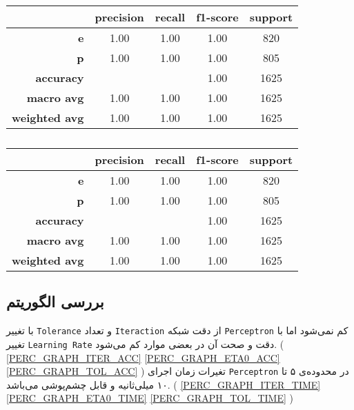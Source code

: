 \begin{latin}
\begin{table}[h!]
  \begin{center}
    \caption{}
    \label{PERC_TAB}
    \begin{tabular}{r|c|c|c|c} %
  & \textbf{precision}  & \textbf{recall} & \textbf{f1-score} & \textbf{support} \\
      \hline
           \textbf{e} & 1.00 & 1.00 & 1.00 & 820\\
           \textbf{p} & 1.00 & 1.00 & 1.00 & 805\\

    \textbf{accuracy} & & & 1.00 & 1625 \\
   \textbf{macro avg} & 1.00 & 1.00 & 1.00 & 1625 \\
\textbf{weighted avg} & 1.00 & 1.00 & 1.00 & 1625
    \end{tabular}
  \end{center}
\end{table}

\begin{table}[h!]
  \begin{center}
    \caption{}
    \label{KNN_TAB}
    \begin{tabular}{r|c|c|c|c} %
  & \textbf{precision}  & \textbf{recall} & \textbf{f1-score} & \textbf{support} \\
      \hline
           \textbf{e} & 1.00 & 1.00 & 1.00 & 820\\
           \textbf{p} & 1.00 & 1.00 & 1.00 & 805\\

    \textbf{accuracy} & & & 1.00 & 1625 \\
   \textbf{macro avg} & 1.00 & 1.00 & 1.00 & 1625 \\
\textbf{weighted avg} & 1.00 & 1.00 & 1.00 & 1625
    \end{tabular}
  \end{center}
\end{table}
\end{latin}

\subsection{بررسی الگوریتم}
با تغییر
\verb;Tolerance;
و
تعداد
\verb;Iteraction;
از دقت شبکه
\verb;Perceptron;
کم نمی‌شود اما با تغییر
\verb;Learning Rate;
دقت و صحت آن در بعضی موارد کم می‌شود.
(
\cref{PERC_GRAPH_ITER_ACC}
\cref{PERC_GRAPH_ETA0_ACC}
\cref{PERC_GRAPH_TOL_ACC}
)
تغیرات زمان اجرای
\verb;Perceptron;
در محدوده‌ی ۵ تا ۱۰ میلی‌ثانیه و قابل چشم‌پوشی می‌باشد.
(
\cref{PERC_GRAPH_ITER_TIME}
\cref{PERC_GRAPH_ETA0_TIME}
\cref{PERC_GRAPH_TOL_TIME}
)

